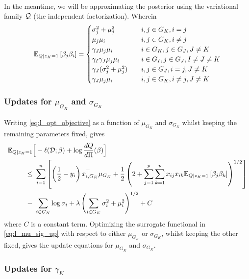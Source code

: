\documentclass[12pt]{article}
\begin{document}
In the meantime, we will be approximating the posterior using the variational family $\mathcal{Q}$ (the independent factorization). Wherein
\begin{equation}
    \mathbb{E}_{Q | z_K = 1} \left[ \beta_j \beta_i \right] = \begin{cases}
	\sigma_{j}^2 + \mu_{j}^2 		& \quad i,j \in G_K, i=j \\
	\mu_{j}\mu_{i} 				& \quad i,j \in G_K, i \neq j \\
	\gamma_J \mu_{j} \mu_{i} 		& \quad i \in G_K, j \in G_J, J \neq K \\
	\gamma_I \gamma_J \mu_{j}\mu_{i} 	& \quad i \in G_I, j \in G_J, I \neq J \neq K \\
	\gamma_J (\sigma_{j}^2 + \mu_{j}^2) 	& \quad i,j \in G_J, i=j, J \neq K \\
	\gamma_J \mu_{j}\mu_{i} 		& \quad i,j \in G_K, i \neq j, J \neq K
    \end{cases}
\end{equation}

\subsubsection{Updates for $\mu_{G_K}$ and $\sigma_{G_K}$}

Writing \eqref{eq:l_opt_objective} as a function of $\mu_{G_K}$ and $\sigma_{G_K}$ whilst keeping the remaining parameters fixed, gives
\begin{equation} \label{eq:l_mu_sig_up} 
\begin{aligned}
    \mathbb{E}_{Q | z_K = 1} & \Big[ 
	-  \ell(\mathcal{D}; \beta) + \log \frac{dQ}{d\Pi}(\beta) 
    \Big]  \\
\leq &\
    \sum_{i=1}^n \left[
	\left( \frac{1}{2} - y_i \right) x_{i, G_K}^\top \mu_{G_K} +
	\frac{1}{2} \left( 2 + \sum_{j=1}^p \sum_{k=1}^p x_{ij} x_{ik} 
	\mathbb{E}_{Q | z_K = 1} \left[ \beta_j \beta_k \right] \right)^{1/2} 
    \right] \\
- &\
    \sum_{i \in G_K} \log{\sigma_i}
+
    \lambda \left( \sum_{i \in G_K} 
	\sigma_i^2 + \mu_i^2
    \right)^{1/2} + C
\end{aligned}
\end{equation}
where $C$ is a constant term. Optimizing the surrogate functional in \eqref{eq:l_mu_sig_up} with respect to either $\mu_{G_K}$ or $\sigma_{G_K}$, whilst keeping the other fixed, gives the update equations for $\mu_{G_K}$ and $\sigma_{G_K}$.


\subsubsection{Updates for $\gamma_K$}
\end{document}
